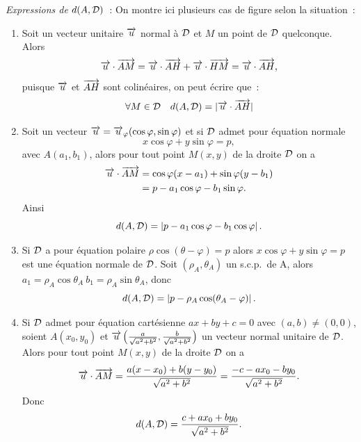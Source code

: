 \emph{Expressions de \(d(A , \mathcal{D})\)}~:
On montre ici plusieurs cas de figure selon la situation~:
\begin{enumerate}
  \item Soit un vecteur unitaire \(\overrightarrow{u}\) normal à \(\mathcal{D}\) et \(M\) un point de
    \(\mathcal{D}\) quelconque. Alors
    \begin{equation}
      \overrightarrow{u} \cdot \overrightarrow{AM} = \overrightarrow{u} \cdot \overrightarrow{AH} + \overrightarrow{u} \cdot \overrightarrow{HM} = \overrightarrow{u}
      \cdot \overrightarrow{AH},
    \end{equation}
    puisque \(\overrightarrow{u}\) et \(\overrightarrow{AH}\) sont colinéaires, on peut écrire que~:
    \begin{equation}
      \forall M \in \mathcal{D} \quad d(A , \mathcal{D}) = |\overrightarrow{u} \cdot \overrightarrow{AH}|
    \end{equation}
  \item Soit un vecteur \(\overrightarrow{u} = \overrightarrow{u}_\varphi(\cos \varphi, \sin \varphi)\) et
    si \(\mathcal{D}\) admet pour équation normale
    \begin{equation}
      x \cos \varphi + y \sin \varphi = p,
    \end{equation}
    avec \(A(a_1 , b_1)\), alors pour tout point \(M(x , y)\) de la droite
    \(\mathcal{D}\) on a
    \begin{align}
      \overrightarrow{u} \cdot \overrightarrow{AM} &= \cos \varphi (x - a_1) + \sin \varphi (y - b_1)\\
                          &= p - a_1\cos\varphi -b_1\sin\varphi.
    \end{align}
    Ainsi
    \begin{equation}
      d(A , \mathcal{D}) = \left\lvert p - a_1\cos\varphi - b_1\cos\varphi\right\rvert.
    \end{equation}
  \item Si \(\mathcal{D}\) a pour équation polaire \(\rho\cos(\theta - \varphi) = p\)
    alors \(x \cos \varphi + y \sin \varphi = p\) est une équation normale de
    \(\mathcal{D}\). Soit \((\rho_A , \theta_A)\) un s.c.p.\ de A, alors \(a_1 =
    \rho_A\cos\theta_A \ b_1 = \rho_A\sin\theta_A\), donc
    \begin{equation}
      d(A , \mathcal{D}) = \left\lvert p - \rho_A\cos(\theta_A - \varphi)\right\rvert.
    \end{equation}
  \item Si \(\mathcal{D}\) admet pour équation cartésienne \(ax + by + c = 0\) avec
    \((a , b) \neq (0 , 0)\), soient \(A(x_0 , y_0)\) et \(\overrightarrow{u}
    \left(\frac{a}{\sqrt{a^2 + b^2}}, \frac{b}{\sqrt{a^2 + b^2}}\right)\) un
    vecteur normal unitaire de \(\mathcal{D}\). Alors pour tout point \(M(x , y)\) de
    la droite \(\mathcal{D}\) on a
    \begin{equation}
      \overrightarrow{u}\cdot\overrightarrow{AM} = \frac{a(x - x_0) + b(y - y_0)}{\sqrt{a^2 + b^2}} =
      \frac{-c - ax_0 - by_0}{\sqrt{a^2 + b^2}}.
    \end{equation}
    Donc
    \begin{equation}
      d(A , \mathcal{D}) = \frac{c + ax_0 + by_0}{\sqrt{a^2 + b^2}}.
    \end{equation}
\end{enumerate}

